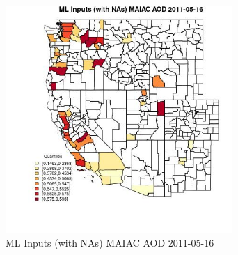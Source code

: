 \begin{figure} 
\centering  
\includegraphics[width=0.77\textwidth]{Code_Outputs/Report_ML_input_PM25_Step4_part_e_de_duplicated_aveswNAs_CountyMAIAC_AODMean2011-05-16_2011-05-16.jpg} 
\caption{\label{fig:Report_ML_input_PM25_Step4_part_e_de_duplicated_aveswNAsCountyMAIAC_AODMean2011-05-16_2011-05-16}ML Inputs (with NAs) MAIAC AOD 2011-05-16} 
\end{figure} 
 
